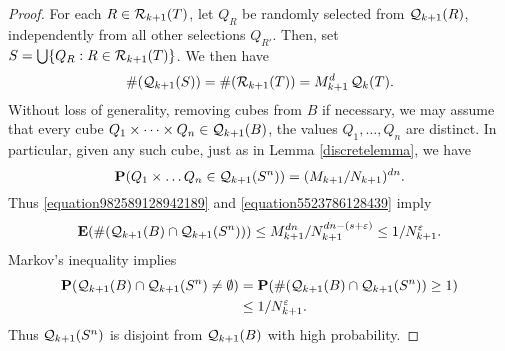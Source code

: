 \begin{proof}
    For each $R \in \operatorname{\mathcal{R}}_{k+1}(T)$, let $Q_R$ be randomly selected from $\operatorname{\mathcal{Q}}_{k+1}(R)$, independently from all other selections $Q_{R'}$. Then, set $S = \bigcup \{ Q_R: R \in \operatorname{\mathcal{R}}_{k+1}(T) \}$. We then have
    \[ \#(\operatorname{\mathcal{Q}}_{k+1}(S)) = \#(\operatorname{\mathcal{R}}_{k+1}(T)) = M_{k+1}^d \operatorname{\mathcal{Q}}_k(T). \]
    Without loss of generality, removing cubes from $B$ if necessary, we may assume that every cube $Q_1 \times \dots \times Q_n \in \operatorname{\mathcal{Q}}_{k+1}(B)$, the values $Q_1, \dots, Q_n$ are distinct. In particular, given any such cube, just as in Lemma \ref{discretelemma}, we have
    \[ \mathbf{P}(Q_1 \times \dots Q_n \in \operatorname{\mathcal{Q}}_{k+1}(S^n)) = (M_{k+1}/N_{k+1})^{dn}. \]
    Thus \eqref{equation982589128942189} and \eqref{equation5523786128439} imply
    \[ \mathbf{E}(\#(\operatorname{\mathcal{Q}}_{k+1}(B) \cap \operatorname{\mathcal{Q}}_{k+1}(S^n))) \leq M_{k+1}^{dn}/N_{k+1}^{dn - (s + \varepsilon)} \leq 1/N_{k+1}^\varepsilon. \]
    Markov's inequality implies
    \begin{equation} \label{fourierdim2}
    \begin{split}
        \mathbf{P}(\operatorname{\mathcal{Q}}_{k+1}(B) \cap \operatorname{\mathcal{Q}}_{k+1}(S^n) \neq \emptyset) &= \mathbf{P}(\# (\operatorname{\mathcal{Q}}_{k+1}(B) \cap \operatorname{\mathcal{Q}}_{k+1}(S^n)) \geq 1)\\
        &\leq 1/N_{k+1}^\varepsilon.
    \end{split}
    \end{equation}
    Thus $\operatorname{\mathcal{Q}}_{k+1}(S^n)$ is disjoint from $\operatorname{\mathcal{Q}}_{k+1}(B)$ with high probability.


\end{proof}
